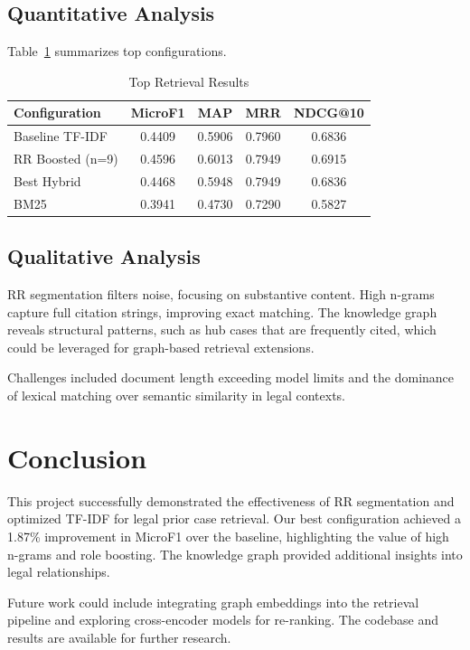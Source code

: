 \documentclass[11pt]{article}
\begin{document}
\subsection{Quantitative Analysis}
Table~\ref{tab:results} summarizes top configurations.

\begin{table}[h]
    \centering
    \begin{tabular}{lcccc}
        \hline
        Configuration & MicroF1 & MAP & MRR & NDCG@10 \\
        \hline
        Baseline TF-IDF & 0.4409 & 0.5906 & 0.7960 & 0.6836 \\
        RR Boosted (n=9) & 0.4596 & 0.6013 & 0.7949 & 0.6915 \\
        Best Hybrid & 0.4468 & 0.5948 & 0.7949 & 0.6836 \\
        BM25 & 0.3941 & 0.4730 & 0.7290 & 0.5827 \\
        \hline
    \end{tabular}
    \caption{Top Retrieval Results}
    \label{tab:results}
\end{table}

\subsection{Qualitative Analysis}
RR segmentation filters noise, focusing on substantive content. High n-grams capture full citation strings, improving exact matching. The knowledge graph reveals structural patterns, such as hub cases that are frequently cited, which could be leveraged for graph-based retrieval extensions.

Challenges included document length exceeding model limits and the dominance of lexical matching over semantic similarity in legal contexts.

\section{Conclusion}

This project successfully demonstrated the effectiveness of RR segmentation and optimized TF-IDF for legal prior case retrieval. Our best configuration achieved a 1.87\% improvement in MicroF1 over the baseline, highlighting the value of high n-grams and role boosting. The knowledge graph provided additional insights into legal relationships.

Future work could include integrating graph embeddings into the retrieval pipeline and exploring cross-encoder models for re-ranking. The codebase and results are available for further research.


\end{document}

